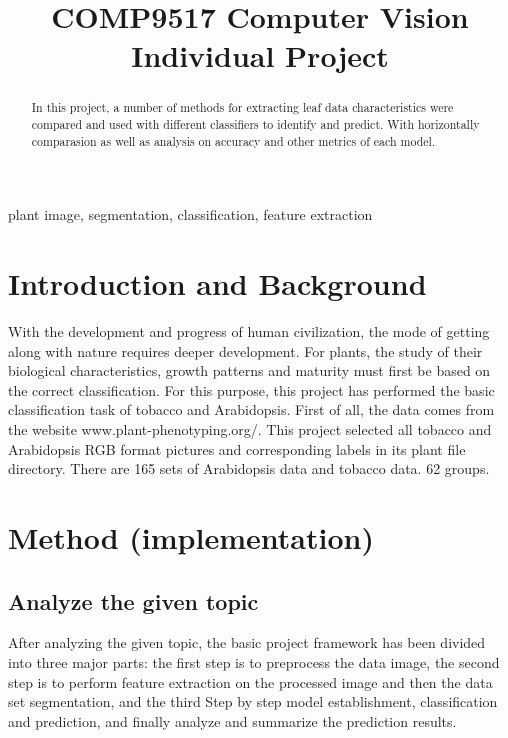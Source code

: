 \documentclass[conference]{IEEEtran}
\begin{document}
\title{COMP9517 Computer Vision Individual Project}

\author{
}

\maketitle

\begin{abstract}
In this project, a number of methods for extracting leaf data characteristics were compared and used with different classifiers to identify and predict. With horizontally comparasion as well as analysis on accuracy and other metrics of each model.
\end{abstract}

\begin{IEEEkeywords}
plant image, segmentation, classification, feature extraction
\end{IEEEkeywords}

\section{Introduction and Background}
With the development and progress of human civilization, the mode of getting along with nature requires deeper development. For plants, the study of their biological characteristics, growth patterns and maturity must first be based on the correct classification. For this purpose, this project has performed the basic classification task of tobacco and Arabidopsis. First of all, the data comes from the website www.plant-phenotyping.org/. This project selected all tobacco and Arabidopsis RGB format pictures and corresponding labels in its plant file directory. There are 165 sets of Arabidopsis data and tobacco data. 62 groups. 

\section{Method (implementation)}

\subsection{Analyze the given topic}

After analyzing the given topic, the basic project framework has been divided into three major parts: the first step is to preprocess the data image, the second step is to perform feature extraction on the processed image and then the data set segmentation, and the third Step by step model establishment, classification and prediction, and finally analyze and summarize the prediction results.
\end{document}
